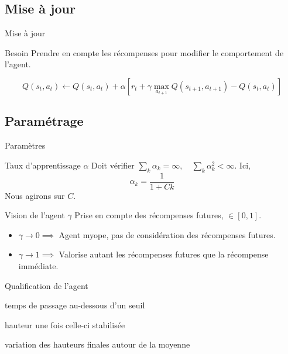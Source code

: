 \documentclass[tikz, footheight=2em]{beamer}
\begin{document}
\subsection{Mise à jour}
\begin{frame}[c]{Mise à jour}
  \begin{block}{Besoin}
    Prendre en compte les récompenses pour modifier le comportement de l'agent.
  \end{block}
  \pause{}
  \[
    Q(s_t, a_t) \leftarrow Q(s_t,a_t) + \alpha
    [r_t + \gamma \max_{a_{t+1}} Q(s_{t+1},a_{t+1}) - Q(s_t,a_t)]
  \]
\end{frame}

\subsection{Paramétrage}
\begin{frame}[c]{Paramètres}
  \begin{block}{Taux d'apprentissage \(\alpha\)}
    Doit vérifier \(\sum_{k} \alpha_k = \infty, \quad
    \sum_k \alpha_k^2 < \infty \).
    \pause{}
    Ici, \[ \alpha_k = \frac{1}{1 + Ck} \]
    Nous agirons sur \(C\).
  \end{block}
  \pause{}
  \begin{block}{Vision de l'agent \(\gamma\)}
    Prise en compte des récompenses futures, \(\in [0,1]\).
    \pause{}
    \begin{itemize}
      \item \(\gamma \to 0 \implies\) Agent myope, pas de considération des
        récompenses futures.
      \item \(\gamma \to 1 \implies\) Valorise autant les récompenses futures
        que la récompense immédiate.
    \end{itemize}
  \end{block}
\end{frame}

\begin{frame}[c]{Qualification de l'agent}
  \begin{description}
    \item[Décroissance] temps de passage au-dessous d'un seuil
    \item[Hauteur finale] hauteur une fois celle-ci stabilisée
    \item[Stabilité] variation des hauteurs finales autour de la moyenne
  \end{description}
  \begin{figure}[H]
  \end{figure}
\end{frame}
\end{document}
